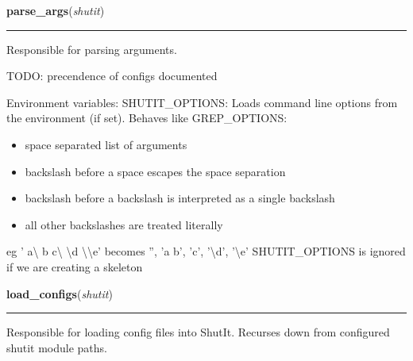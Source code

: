     \label{util:parse_args}

    \vspace{0.5ex}

\hspace{.8\funcindent}\begin{boxedminipage}{\funcwidth}

    \raggedright \textbf{parse\_args}(\textit{shutit})

    \vspace{-1.5ex}

    \rule{\textwidth}{0.5\fboxrule}
\setlength{\parskip}{2ex}
    Responsible for parsing arguments.

    TODO: precendence of configs documented

    Environment variables: SHUTIT\_OPTIONS: Loads command line options from
    the environment (if set). Behaves like GREP\_OPTIONS:

    \begin{itemize}
    \setlength{\parskip}{0.6ex}
      \item space separated list of arguments

      \item backslash before a space escapes the space separation

      \item backslash before a backslash is interpreted as a single backslash

      \item all other backslashes are treated literally

    \end{itemize}

    eg ' a{\textbackslash} b c{\textbackslash} {\textbackslash}d 
    {\textbackslash}{\textbackslash}e' becomes '', 'a b', 'c', 
    '{\textbackslash}d', '{\textbackslash}e' SHUTIT\_OPTIONS is ignored if 
    we are creating a skeleton

\setlength{\parskip}{1ex}
    \end{boxedminipage}

    \label{util:load_configs}

    \vspace{0.5ex}

\hspace{.8\funcindent}\begin{boxedminipage}{\funcwidth}

    \raggedright \textbf{load\_configs}(\textit{shutit})

    \vspace{-1.5ex}

    \rule{\textwidth}{0.5\fboxrule}
\setlength{\parskip}{2ex}
    Responsible for loading config files into ShutIt. Recurses down from 
    configured shutit module paths.

\setlength{\parskip}{1ex}
    \end{boxedminipage}

